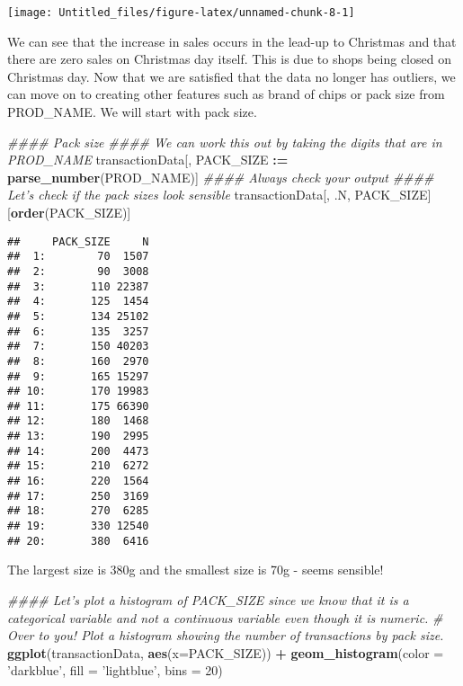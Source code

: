 \documentclass[]{article}
\newenvironment{Shaded}{\begin{snugshade}}{\end{snugshade}}
\newcommand{\CommentTok}[1]{\textcolor[rgb]{0.56,0.35,0.01}{\textit{#1}}}
\newcommand{\DataTypeTok}[1]{\textcolor[rgb]{0.13,0.29,0.53}{#1}}
\newcommand{\DecValTok}[1]{\textcolor[rgb]{0.00,0.00,0.81}{#1}}
\newcommand{\ErrorTok}[1]{\textcolor[rgb]{0.64,0.00,0.00}{\textbf{#1}}}
\newcommand{\KeywordTok}[1]{\textcolor[rgb]{0.13,0.29,0.53}{\textbf{#1}}}
\newcommand{\NormalTok}[1]{#1}
\newcommand{\OperatorTok}[1]{\textcolor[rgb]{0.81,0.36,0.00}{\textbf{#1}}}
\newcommand{\StringTok}[1]{\textcolor[rgb]{0.31,0.60,0.02}{#1}}
\begin{document}
\begin{center}\texttt{[image: Untitled\_files/figure-latex/unnamed-chunk-8-1]} \end{center}

We can see that the increase in sales occurs in the lead-up to Christmas
and that there are zero sales on Christmas day itself. This is due to
shops being closed on Christmas day. Now that we are satisfied that the
data no longer has outliers, we can move on to creating other features
such as brand of chips or pack size from PROD\_NAME. We will start with
pack size.

\begin{Shaded}
\begin{Highlighting}[]
\CommentTok{#### Pack size}
\CommentTok{#### We can work this out by taking the digits that are in PROD_NAME}
\NormalTok{transactionData[, PACK_SIZE }\OperatorTok{:}\ErrorTok{=}\StringTok{ }\KeywordTok{parse_number}\NormalTok{(PROD_NAME)]}
\CommentTok{#### Always check your output}
\CommentTok{#### Let's check if the pack sizes look sensible}
\NormalTok{transactionData[, .N, PACK_SIZE][}\KeywordTok{order}\NormalTok{(PACK_SIZE)]}
\end{Highlighting}
\end{Shaded}

\begin{verbatim}
##     PACK_SIZE     N
##  1:        70  1507
##  2:        90  3008
##  3:       110 22387
##  4:       125  1454
##  5:       134 25102
##  6:       135  3257
##  7:       150 40203
##  8:       160  2970
##  9:       165 15297
## 10:       170 19983
## 11:       175 66390
## 12:       180  1468
## 13:       190  2995
## 14:       200  4473
## 15:       210  6272
## 16:       220  1564
## 17:       250  3169
## 18:       270  6285
## 19:       330 12540
## 20:       380  6416
\end{verbatim}

The largest size is 380g and the smallest size is 70g - seems sensible!

\begin{Shaded}
\begin{Highlighting}[]
\CommentTok{#### Let's plot a histogram of PACK_SIZE since we know that it is a categorical variable and not a continuous variable even though it is numeric.}
\CommentTok{# Over to you! Plot a histogram showing the number of transactions by pack size.}
\KeywordTok{ggplot}\NormalTok{(transactionData, }\KeywordTok{aes}\NormalTok{(}\DataTypeTok{x=}\NormalTok{PACK_SIZE)) }\OperatorTok{+}
\StringTok{  }\KeywordTok{geom_histogram}\NormalTok{(}\DataTypeTok{color =} \StringTok{'darkblue'}\NormalTok{, }\DataTypeTok{fill =} \StringTok{'lightblue'}\NormalTok{, }\DataTypeTok{bins =} \DecValTok{20}\NormalTok{)}
\end{Highlighting}
\end{Shaded}
\end{document}
